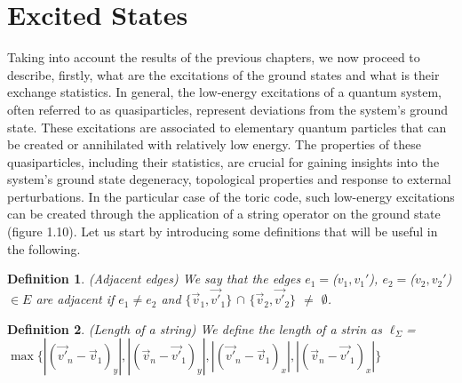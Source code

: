 \documentclass{Configuration_Files/PoliMi3i_thesis}
\newtheorem{definition}{Definition}[chapter]
\begin{document}





















\newpage
\section{Excited States}
\label{sec:ES}


Taking into account the results of the previous chapters, we now proceed to describe, firstly, what are the excitations of the ground states and what is their exchange statistics. In general, the low-energy excitations of a quantum system, often referred to as quasiparticles, represent deviations from the system's ground state. These excitations are associated to elementary quantum particles that can be created or annihilated with relatively low energy. The properties of these quasiparticles, including their statistics, are crucial for gaining insights into the system's ground state degeneracy, topological properties and response to external perturbations. \newline
In the particular case of the toric code, such low-energy excitations can be created through the application of a string operator on the ground state (figure 1.10). Let us start by introducing some definitions that will be useful in the following.

\begin{definition}(Adjacent edges)
	We say that the edges  $e_1=$($v_1,v_1'$), $e_2=$($v_2,v_2'$) $\in E$ are adjacent if $e_1\neq e_2$ and $\{ \vec{v}_1, \vec{v'}_1\}$ $\cap $ $\{ \vec{v}_2, \vec{v'}_2\}$ $\neq$ $\emptyset$.
\end{definition}

\begin{definition}(Length of a string)
	We define the length of a strin as $\ell_\Sigma$=$\max \{ |(\vec{v'}_n-\vec{v}_1)_y|, |(\vec{v}_n-\vec{v'}_1)_y|, |(\vec{v'}_n-\vec{v}_1)_x|, |(\vec{v}_n-\vec{v'}_1)_x| \}$
\end{definition}
\end{document}
